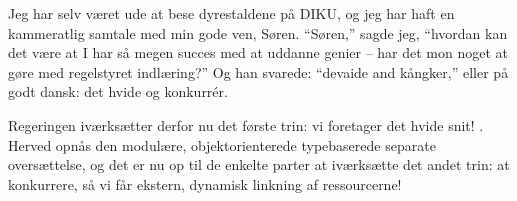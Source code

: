 \documentclass[11pt,danish]{article}
\begin{document}
\begin{sketch}
  Jeg har selv været ude at bese dyrestaldene på DIKU, og jeg har haft 
  en kammeratlig samtale med min gode ven, Søren. ``Søren,'' sagde
  jeg, ``hvordan kan det være at I har så megen succes med at uddanne
  genier -- har det mon noget at gøre med regelstyret indlæring?'' Og
  han svarede: ``devaide and kångker,'' eller på godt dansk: det hvide 
  og konkurrér.

  Regeringen iværksætter derfor nu det første trin: vi foretager det
  hvide snit! 
  . Herved opnås den modulære,
  objektorienterede typebaserede separate oversættelse, og det er nu
  op til de enkelte parter at iværksætte det andet trin: at
  konkurrere, så vi får ekstern, dynamisk linkning af ressourcerne!


\end{sketch}
\end{document}
